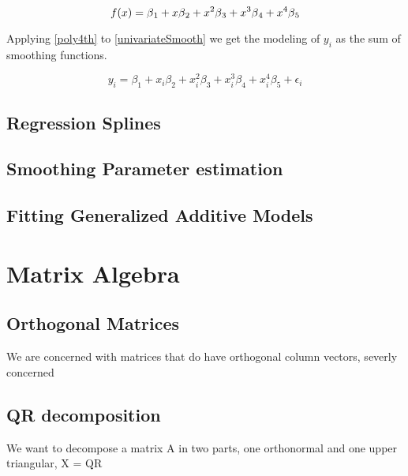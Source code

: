 \documentclass{article}
\begin{document}
    \begin{equation} \label{poly4th} f(x) = \beta \textsubscript{1} + x\beta \textsubscript{2} + x^2\beta \textsubscript{3} + x^3\beta \textsubscript{4} + x^4\beta \textsubscript{5}  \end{equation}

    Applying \ref{poly4th} to \ref{univariateSmooth} we get the modeling of $y_i$ as the sum of smoothing functions.

    \begin{equation} \label{poly4thGAM}  y_i = \beta_1 + x_i\beta_2 + x_i^2\beta_3+ x_i^3\beta_4 + x_i^4\beta_5 + \epsilon_i \end{equation}
    \subsection{Regression Splines}
    \subsection{Smoothing Parameter estimation}
    \subsection{Fitting Generalized Additive Models}

    \section{Matrix Algebra}
    \subsection{Orthogonal Matrices}
    We are concerned with matrices that do have orthogonal column vectors, severly concerned
    \subsection{QR decomposition}
    We want to decompose a matrix A in two parts, one orthonormal and one upper triangular, X = QR


    \newpage


    \newpage
\end{document}
